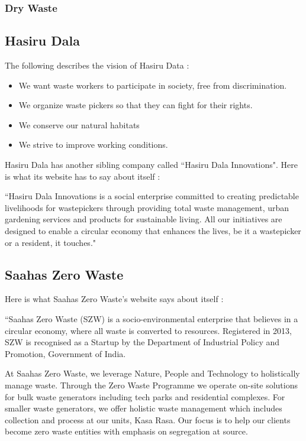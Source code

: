 \documentclass[10pt]{article}
\begin{document}
\subsubsection{Dry Waste}

\subsection{Hasiru Dala}

The following describes the vision of Hasiru Data \citep{HasiruDala:home}:

\begin{itemize}
	\item We want waste workers to participate in society, free from discrimination.
	\item We organize waste pickers so that they can fight for their rights.
	\item We conserve our natural habitats
	\item We strive to improve working conditions.
\end{itemize}

Hasiru Dala has another sibling company called ``Hasiru Dala Innovations". Here is what its website has to say about itself \citep{HasiruDalaInnovations:about}:

``Hasiru Dala Innovations is a social enterprise committed to creating predictable livelihoods for wastepickers through providing total waste management, urban gardening services and products for sustainable living. All our initiatives are designed to enable a circular economy that enhances the lives, be it a wastepicker or a resident, it touches."

\subsection{Saahas Zero Waste}

Here is what Saahas Zero Waste's website says about itself \citep{SaahasZeroWaste:about}:

``Saahas Zero Waste (SZW) is a socio-environmental enterprise that believes in a circular economy, where all waste is converted to resources. Registered in 2013, SZW is recognised as a Startup by the Department of Industrial Policy and Promotion, Government of India.

At Saahas Zero Waste, we leverage Nature, People and Technology to holistically manage waste. Through the Zero Waste Programme we operate on-site solutions for bulk waste generators including tech parks and residential complexes. For smaller waste generators, we offer holistic waste management which includes collection and process at our units, Kasa Rasa. Our focus is to help our clients become zero waste entities with emphasis on segregation at source.
\end{document}

